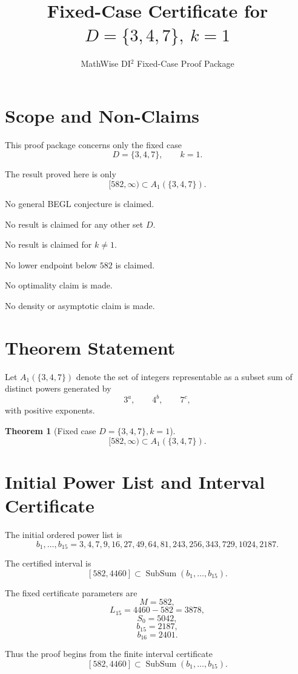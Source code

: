\documentclass[11pt]{article}
\title{Fixed-Case Certificate for \(D=\{3,4,7\},\ k=1\)}
\author{MathWise DI\(^2\) Fixed-Case Proof Package}
\date{}
\newtheorem{theorem}{Theorem}
\newcommand{\SubSum}{\operatorname{SubSum}}
\begin{document}
\maketitle

\section{Scope and Non-Claims}

This proof package concerns only the fixed case
\[
D=\{3,4,7\},\qquad k=1.
\]

The result proved here is only
\[
[582,\infty)\subset A_1(\{3,4,7\}).
\]

No general BEGL conjecture is claimed.

No result is claimed for any other set \(D\).

No result is claimed for \(k\ne 1\).

No lower endpoint below \(582\) is claimed.

No optimality claim is made.

No density or asymptotic claim is made.

\section{Theorem Statement}

Let \(A_1(\{3,4,7\})\) denote the set of integers representable as a subset sum of distinct powers generated by
\[
3^a,\qquad 4^b,\qquad 7^c,
\]
with positive exponents.

\begin{theorem}[Fixed case \(D=\{3,4,7\}, k=1\)]
\[
[582,\infty) \subset A_1(\{3,4,7\}).
\]
\end{theorem}

\section{Initial Power List and Interval Certificate}

The initial ordered power list is
\[
b_1,\ldots,b_{15}
=
3,4,7,9,16,27,49,64,81,243,256,343,729,1024,2187.
\]

The certified interval is
\[
[582,4460]\subset \SubSum(b_1,\ldots,b_{15}).
\]

The fixed certificate parameters are
\[
M=582,
\]
\[
L_{15}=4460-582=3878,
\]
\[
S_0=5042,
\]
\[
b_{15}=2187,
\]
\[
b_{16}=2401.
\]

Thus the proof begins from the finite interval certificate
\[
[582,4460]\subset \SubSum(b_1,\ldots,b_{15}).
\]
\end{document}
